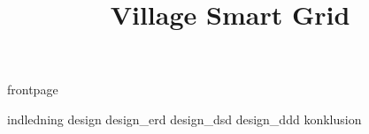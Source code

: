 \documentclass[a4paper]{article}								%
\title{Village Smart Grid}
\begin{document}

	{frontpage}

	\tableofcontents\thispagestyle{fancy} \newpage


	{indledning}
	\newpage
	{design}
	{design_erd}
	{design_dsd}
	{design_ddd}
	\newpage
	{konklusion} 


\end{document}
